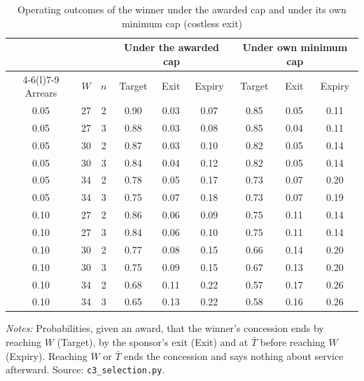 \begin{table}[htbp]\centering\small
\caption{Operating outcomes of the winner under the awarded cap and under its own minimum cap (costless exit)}\label{tab:c3oper}
\begin{threeparttable}\begin{tabular}{ccccccccc}\toprule
 & & & \multicolumn{3}{c}{Under the awarded cap} & \multicolumn{3}{c}{Under own minimum cap}\\\cmidrule(lr){4-6}\cmidrule(l){7-9}
Arrears & $W$ & $n$ & Target & Exit & Expiry & Target & Exit & Expiry\\\midrule
0.05 & 27 & 2 & 0.90 & 0.03 & 0.07 & 0.85 & 0.05 & 0.11\\
0.05 & 27 & 3 & 0.88 & 0.03 & 0.08 & 0.85 & 0.04 & 0.11\\
0.05 & 30 & 2 & 0.87 & 0.03 & 0.10 & 0.82 & 0.05 & 0.14\\
0.05 & 30 & 3 & 0.84 & 0.04 & 0.12 & 0.82 & 0.05 & 0.14\\
0.05 & 34 & 2 & 0.78 & 0.05 & 0.17 & 0.73 & 0.07 & 0.20\\
0.05 & 34 & 3 & 0.75 & 0.07 & 0.18 & 0.73 & 0.07 & 0.19\\
0.10 & 27 & 2 & 0.86 & 0.06 & 0.09 & 0.75 & 0.11 & 0.14\\
0.10 & 27 & 3 & 0.84 & 0.06 & 0.10 & 0.75 & 0.11 & 0.14\\
0.10 & 30 & 2 & 0.77 & 0.08 & 0.15 & 0.66 & 0.14 & 0.20\\
0.10 & 30 & 3 & 0.75 & 0.09 & 0.15 & 0.67 & 0.13 & 0.20\\
0.10 & 34 & 2 & 0.68 & 0.11 & 0.22 & 0.57 & 0.17 & 0.26\\
0.10 & 34 & 3 & 0.65 & 0.13 & 0.22 & 0.58 & 0.16 & 0.26\\
\bottomrule\end{tabular}
\begin{tablenotes}\footnotesize\item \textit{Notes:} Probabilities, given an award, that the winner's concession ends by reaching $W$ (Target), by the sponsor's exit (Exit) and at $\bar T$ before reaching $W$ (Expiry). Reaching $W$ or $\bar T$ ends the concession and says nothing about service afterward. Source: \texttt{c3\_selection.py}.\end{tablenotes}
\end{threeparttable}\end{table}